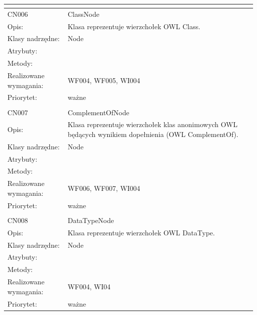 \begin{center}
\begin{longtable}{|m{3cm}|m{9cm}|}
\multicolumn{2}{c}{} \\
 \hline

CN006 & ClassNode \\ \hline
Opis: & Klasa reprezentuje wierzchołek OWL Class.    \\ \hline
Klasy nadrzędne: & Node     \\ \hline
Atrybuty: & %
 \\ \hline
Metody: & %
  \\ \hline
Realizowane wymagania: & WF004, WF005, WI004 \\ \hline
Priorytet: & ważne  \\ \hline

\multicolumn{2}{c}{} \\
 \hline

CN007 & ComplementOfNode \\ \hline
Opis: & Klasa reprezentuje wierzchołek klas anonimowych OWL będących wynikiem dopełnienia (OWL ComplementOf).    \\ \hline
Klasy nadrzędne: & Node     \\ \hline
Atrybuty: & %
 \\ \hline
Metody: & %
  \\ \hline
Realizowane wymagania: & WF006, WF007, WI004 \\ \hline
Priorytet: & ważne  \\ \hline

\multicolumn{2}{c}{} \\
 \hline

CN008 & DataTypeNode \\ \hline
Opis: & Klasa reprezentuje wierzchołek OWL DataType.    \\ \hline
Klasy nadrzędne: & Node     \\ \hline
Atrybuty: & %
 \\ \hline
Metody: & %
  \\ \hline
Realizowane wymagania: & WF004, WI04 \\ \hline
Priorytet: & ważne  \\ \hline


\end{longtable}
\end{center}
